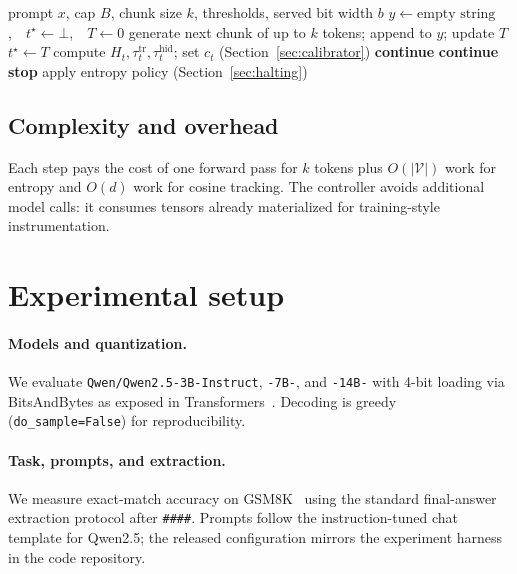 \documentclass[11pt]{article}
\begin{document}
\begin{algorithm}[t]
\caption{Budgeted inference with BitCal-TTS (implementation-aligned sketch)}
\label{alg:bitcal}
\begin{algorithmic}[1]
\REQUIRE prompt $x$, cap $B$, chunk size $k$, thresholds, served bit width $b$
\STATE $y \leftarrow \text{empty string}$,\ \ $t^\star \leftarrow \bot$,\ \ $T \leftarrow 0$
  \STATE generate next chunk of up to $k$ tokens; append to $y$; update $T$
    \STATE $t^\star \leftarrow T$
  \ENDIF
  \STATE compute $H_t,\tau^{\mathrm{tr}}_t,\tau^{\mathrm{hid}}_t$; set $c_t$ (Section~\ref{sec:calibrator})
    \STATE \textbf{continue}
    \STATE \textbf{continue}
    \STATE \textbf{stop}
  \ELSE
    \STATE apply entropy policy (Section~\ref{sec:halting})
  \ENDIF
\ENDWHILE
\end{algorithmic}
\end{algorithm}

\subsection{Complexity and overhead}
Each step pays the cost of one forward pass for $k$ tokens plus $O(|\mathcal{V}|)$ work for entropy and $O(d)$ work for cosine tracking. The controller avoids additional model calls: it consumes tensors already materialized for training-style instrumentation.

\section{Experimental setup}
\paragraph{Models and quantization.}
We evaluate \texttt{Qwen/Qwen2.5-3B-Instruct}, \texttt{-7B-}, and \texttt{-14B-} with 4-bit loading via BitsAndBytes as exposed in Transformers~\cite{transformers,bitsandbytes}. Decoding is greedy (\texttt{do\_sample=False}) for reproducibility.

\paragraph{Task, prompts, and extraction.}
We measure exact-match accuracy on GSM8K~\cite{cobbe2021gsm8k} using the standard final-answer extraction protocol after \texttt{\#\#\#\#}. Prompts follow the instruction-tuned chat template for Qwen2.5; the released configuration mirrors the experiment harness in the code repository.
\end{document}
